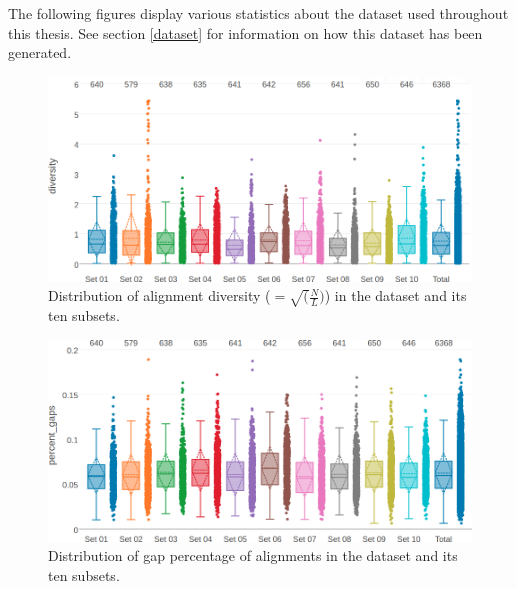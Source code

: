 \documentclass[11pt,a4paper,twoside]{book}
\theoremstyle{definition}
\theoremstyle{definition}
\theoremstyle{remark}
\begin{document}
The following figures display various statistics about the dataset used
throughout this thesis. See section \ref{dataset} for information on how
this dataset has been generated.




\begin{figure}

{\centering \includegraphics[width=1\linewidth]{img/dataset_statistics/diversity_dataset_boxplot_notitle} 

}

\caption{Distribution of alignment diversity
(\(=\sqrt(\frac{N}{L})\)) in the dataset and its ten subsets.}\label{fig:dataset-diversity}
\end{figure}




\begin{figure}

{\centering \includegraphics[width=1\linewidth]{img/dataset_statistics/gap_percentage_boxplot_notitle} 

}

\caption{Distribution of gap percentage of alignments in the
dataset and its ten subsets.}\label{fig:dataset-gaps}
\end{figure}
\end{document}
